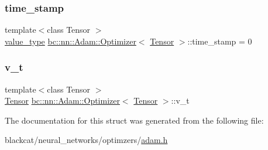 \mbox{\label{structbc_1_1nn_1_1Adam_1_1Optimizer_a8cc7829ee8d768436af25b832b58a80b}} 
\subsubsection{\texorpdfstring{time\+\_\+stamp}{time\_stamp}}
{\footnotesize\ttfamily template$<$class Tensor $>$ \\
\hyperlink{structbc_1_1nn_1_1Adam_1_1Optimizer_a6c0f45fad49cbec9368339576806cb75}{value\+\_\+type} \hyperlink{structbc_1_1nn_1_1Adam_1_1Optimizer}{bc\+::nn\+::\+Adam\+::\+Optimizer}$<$ \hyperlink{namespacebc_a659391e47ab612be3ba6c18cf9c89159}{Tensor} $>$\+::time\+\_\+stamp = 0}

\mbox{\label{structbc_1_1nn_1_1Adam_1_1Optimizer_aef1485ae35e3bff1f0bc4e26e84b829c}} 
\subsubsection{\texorpdfstring{v\+\_\+t}{v\_t}}
{\footnotesize\ttfamily template$<$class Tensor $>$ \\
\hyperlink{namespacebc_a659391e47ab612be3ba6c18cf9c89159}{Tensor} \hyperlink{structbc_1_1nn_1_1Adam_1_1Optimizer}{bc\+::nn\+::\+Adam\+::\+Optimizer}$<$ \hyperlink{namespacebc_a659391e47ab612be3ba6c18cf9c89159}{Tensor} $>$\+::v\+\_\+t}



The documentation for this struct was generated from the following file\+:\begin{DoxyCompactItemize}
\item 
blackcat/neural\+\_\+networks/optimzers/\hyperlink{adam_8h}{adam.\+h}\end{DoxyCompactItemize}
